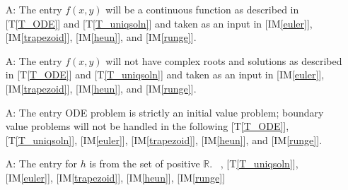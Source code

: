 \documentclass[12pt]{article}
\newcommand{\tref}[1]{T\ref{#1}}
\newcounter{assumpnum} %
\newcommand{\iref}[1]{IM\ref{#1}}
\begin{document}
\begin{itemize}
\item[A\refstepcounter{assumpnum}\theassumpnum \label{A_continuous}:]
The entry $f(x, y)$ will be a continuous function
as described in [\tref{T_ODE}] and [\tref{T_uniqsoln}] and taken as an input in
[\iref{euler}], [\iref{trapezoid}], [\iref{heun}], and [\iref{runge}].

\item[A\refstepcounter{assumpnum}\theassumpnum \label{A_roots}:]
The entry $f(x, y)$ will not have complex roots and solutions
as described in [\tref{T_ODE}] and [\tref{T_uniqsoln}] and taken as an input in
[\iref{euler}], [\iref{trapezoid}], [\iref{heun}], and [\iref{runge}].

\item[A\refstepcounter{assumpnum}\theassumpnum \label{A_boundary}:]
The entry ODE problem is strictly an initial value problem; boundary value problems will
not be handled in the following [\tref{T_ODE}], [\tref{T_uniqsoln}],
[\iref{euler}], [\iref{trapezoid}], [\iref{heun}], and [\iref{runge}].




\item[A\refstepcounter{assumpnum}\theassumpnum \label{A_entriesofh}:]
The entry for $h$ is from the set of positive $\mathbb{R}$.
~\newline
[\tref{T_ODE}], [\tref{T_uniqsoln}],
[\iref{euler}], [\iref{trapezoid}], [\iref{heun}], [\iref{runge}]


\end{itemize}
\end{document}
